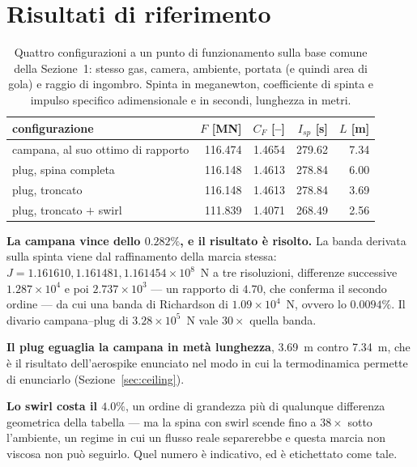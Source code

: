 \section{Risultati di riferimento}

\begin{table}[htbp]
\centering
\small
\begin{tabular}{lrrrr}
\toprule
configurazione & $F$ [MN] & $C_F$ [--] & $I_{sp}$ [s] & $L$ [m] \\
\midrule
campana, al suo ottimo di rapporto & 116.474 & 1.4654 & 279.62 & 7.34 \\
plug, spina completa               & 116.148 & 1.4613 & 278.84 & 6.00 \\
plug, troncato                     & 116.148 & 1.4613 & 278.84 & 3.69 \\
plug, troncato $+$ swirl           & 111.839 & 1.4071 & 268.49 & 2.56 \\
\bottomrule
\end{tabular}
\caption{Quattro configurazioni a un punto di funzionamento sulla
base comune della Sezione~1: stesso gas, camera, ambiente, portata
(e quindi area di gola) e raggio di ingombro. Spinta in meganewton,
coefficiente di spinta e impulso specifico adimensionale e in
secondi, lunghezza in metri.}
\label{tab:configcompare}
\end{table}

\textbf{La campana vince dello $0.282\%$, e il risultato è
risolto.} La banda derivata sulla spinta viene dal raffinamento della
marcia stessa: $J = 1.161610, 1.161481, 1.161454 \times 10^{8}$~N a
tre risoluzioni, differenze successive $1.287\times10^{4}$ e poi
$2.737\times10^{3}$ --- un rapporto di $4.70$, che conferma il
secondo ordine --- da cui una banda di Richardson di
$1.09\times10^{4}$~N, ovvero lo $0.0094\%$. Il divario
campana--plug di $3.28\times10^{5}$~N vale $30\times$ quella banda.

\textbf{Il plug eguaglia la campana in metà lunghezza}, 3.69~m contro
7.34~m, che è il risultato dell'aerospike enunciato nel modo in cui
la termodinamica permette di enunciarlo
(Sezione~\ref{sec:ceiling}).

\textbf{Lo swirl costa il $4.0\%$}, un ordine di grandezza più di
qualunque differenza geometrica della tabella --- ma la spina con
swirl scende fino a $38\times$ sotto l'ambiente, un regime in cui un
flusso reale separerebbe e questa marcia non viscosa non può
seguirlo. Quel numero è indicativo, ed è etichettato come tale.

